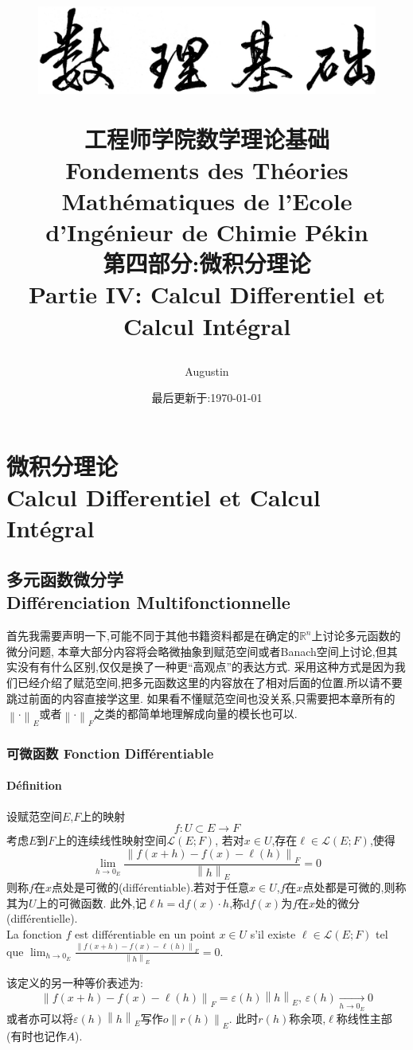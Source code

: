 \documentclass[12pt, a4paper, oneside]{ctexbook}
\title{
\vspace{-2cm}
  \begin{figure}[!t]%
    \centering
    \includegraphics[width=14cm]{shulijichu-2.png}
  \end{figure}
  \vspace{-2cm}
  {\Huge{\textbf{工程师学院数学理论基础\\
Fondements des Théories Mathématiques de l'Ecole d'Ingénieur de Chimie Pékin\\
第四部分:微积分理论\\
Partie IV: Calcul Differentiel et Calcul Intégral
}}}
}
\author{Augustin}
\date{最后更新于:\today}
\newcommand{\di }{\text{d}}%
\newcommand{\R }{\mathbb{R}}%
\begin{document}
\vspace{-3cm}
\maketitle
\tableofcontents
\else
\part{微积分理论\\ Calcul Differentiel et Calcul Intégral}
\fi
\chapter{多元函数微分学\\ Différenciation Multifonctionnelle}
  首先我需要声明一下,可能不同于其他书籍资料都是在确定的$\R^n$上讨论多元函数的微分问题,
  本章大部分内容将会略微抽象到赋范空间或者Banach空间上讨论,但其实没有有什么区别,仅仅是换了一种更“高观点”的表达方式.
  采用这种方式是因为我们已经介绍了赋范空间,把多元函数这里的内容放在了相对后面的位置.所以请不要跳过前面的内容直接学这里.
  如果看不懂赋范空间也没关系,只需要把本章所有的$\left\lVert \cdot \right\rVert _E$或者$\left\lVert \cdot \right\rVert _F$之类的都简单地理解成向量的模长也可以.
\section{可微函数 Fonction Différentiable}
  \subsection{Définition}
    设赋范空间$E$,$F$上的映射
    $$
    f:U\subset E\rightarrow F
    $$
    考虑$E$到$F$上的连续线性映射空间$\mathcal{L}(E;F)$,
    若对$x\in U$,存在$\ell\in \mathcal{L}(E;F)$,使得
    $$
      \lim_{h \to 0_E}\frac{\left\lVert f(x+h)-f(x)-\ell(h)\right\rVert _F }{\left\lVert h\right\rVert _E}  =0
    $$
    则称$f$在$x$点处是可微的(différentiable).若对于任意$x\in U$,$f$在$x$点处都是可微的,则称其为$U$上的可微函数.
    此外,记$\ell h=\di f(x)\cdot h$,称$\di f(x)$为$f$在$x$处的微分(différentielle).\\
    \indent
    La fonction $f$ est différentiable en un point $x\in U$ s'il existe $\ell\in \mathcal{L}(E; F) $ tel que 
    $\lim_{h \to 0_E}\frac{\left\lVert f(x+h)-f(x)-\ell(h)\right\rVert _F }{\left\lVert h\right\rVert _E}  =0$.


    该定义的另一种等价表述为:
    $$
    \left\lVert f(x+h)-f(x)-\ell(h)\right\rVert _F =\varepsilon(h)\left\lVert h \right\rVert _E,\,\varepsilon (h)\xrightarrow[h\rightarrow 0_E]{}0
    $$
    或者亦可以将$\varepsilon(h)\left\lVert h \right\rVert _E$写作$o \left\lVert r(h) \right\rVert _E$.
    此时$r(h)$称余项,$\ell$称线性主部(有时也记作$A$).
\end{document}
